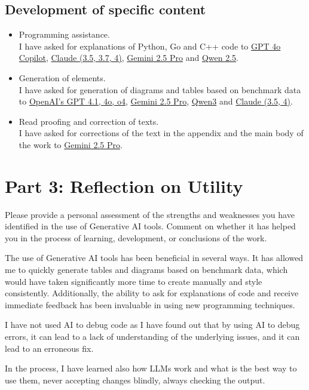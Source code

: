 \subsection*{Development of specific content}
\begin{itemize}
  \item Programming assistance. \\
  I have asked for explanations of Python, Go and C++ code to \href{https://openai.com}{GPT 4o Copilot}, \href{https://www.anthropic.com/api}{Claude (3.5, 3.7, 4)}, \href{https://deepmind.google/models/gemini/pro/}{Gemini 2.5 Pro} and \href{https://qwenlm.github.io/}{Qwen 2.5}.

  \item Generation of elements. \\
  I have asked for generation of diagrams and tables based on benchmark data to \href{https://openai.com}{OpenAI's GPT 4.1, 4o, o4}, \href{https://deepmind.google/models/gemini/pro/}{Gemini 2.5 Pro}, \href{https://qwenlm.github.io/}{Qwen3} and \href{https://www.anthropic.com/api}{Claude (3.5, 4)}.

  \item Read proofing and correction of texts. \\
  I have asked for corrections of the text in the appendix and the main body of the work to \href{https://openai.com}{Gemini 2.5 Pro}.
\end{itemize}

\section*{Part 3: Reflection on Utility}

Please provide a personal assessment of the strengths and weaknesses you have identified in the use of Generative AI tools. Comment on whether it has helped you in the process of learning, development, or conclusions of the work.

The use of Generative AI tools has been beneficial in several ways. It has allowed me to quickly generate tables and diagrams based on benchmark data, which would have taken significantly more time to create manually and style consistently. Additionally, the ability to ask for explanations of code and receive immediate feedback has been invaluable in using new programming techniques.

I have not used AI to debug code as I have found out that by using AI to debug errors, it can lead to a lack of understanding of the underlying issues, and it can lead to an erroneous fix. 

In the process, I have learned also how LLMs work and what is the best way to use them, never accepting changes blindly, always checking the output.